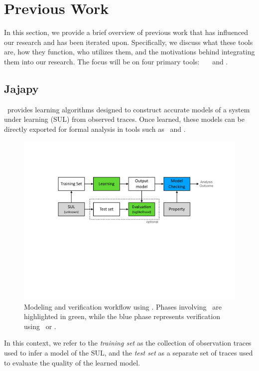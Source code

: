 \section{Previous Work}\label{sec:jajapy_and_cupaal}
In this section, we provide a brief overview of previous work that has influenced our research and has been iterated upon.
Specifically, we discuss what these tools are, how they function, who utilizes them, and the motivations behind integrating them into our research.
The focus will be on four primary tools: \Prism\, \Storm\, \Jajapy\ and \Cupaal.


\subsection{Jajapy}\label{sec:jajapy}
\Jajapy\ provides learning algorithms designed to construct accurate models of a system under learning (SUL) from observed traces.
Once learned, these models can be directly exported for formal analysis in tools such as \Storm~and \Prism.


\begin{figure}[htb!]
    \centering
    \includegraphics[width=\columnwidth]{figures/workflow.pdf}
    \caption{Modeling and verification workflow using \Jajapy. Phases involving \Jajapy\ are highlighted in green, while the blue phase represents verification using \Storm~or \Prism.}
    \label{fig:workflow}
\end{figure}


In this context, we refer to the \textit{training set} as the collection of observation traces used to infer a model of the SUL, and the \textit{test set} as a separate set of traces used to evaluate the quality of the learned model.


